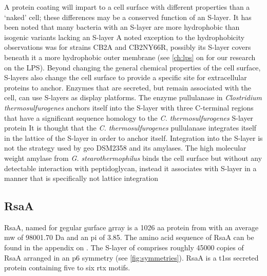 A protein coating will impart to a cell surface with different properties than a `naked' cell; these differences may be a conserved function of an \ac{S-layer}.
 It has been noted that many bacteria with an \ac{S-layer} are more hydrophobic than isogenic variants lacking an \ac{S-layer} A noted exception to the hydrophobicity observations was for \caulobacter strains CB2A and CB2NY66R, possibly its \ac{S-layer} covers beneath it a more hydrophobic outer membrane (see \cref{ch:lps} on  for our research on the \caulobacter \ac{LPS}). Beyond changing the general chemical properties of the cell surface, \acp{S-layer} also change the cell surface to provide a specific site for extracellular proteins to anchor. Enzymes that are secreted, but remain associated with the cell, can use \acp{S-layer} as display platforms. The enzyme pullulanase in \textit{Clostridium thermosulfurogenes} anchors itself into the \ac{S-layer} with three C-terminal regions that have a significant sequence homology to the \textit{C. thermosulfurogenes} \ac{S-layer} protein It is thought that the \textit{C. thermosulfurogenes} pullulanase integrates itself in the lattice of the \ac{S-layer} in order to anchor itself. Integration into the \ac{S-layer} is not the strategy used by \ac{geo} DSM2358 and its amylases. The high molecular weight amylase from \textit{G. stearothermophilus} binds the cell surface but without any detectable interaction with peptidoglycan, instead it associates with \ac{S-layer} in a manner that is specifically not lattice integration


\subsection{RsaA} \label{sec:intro-rsaa}

RsaA, named for \underline{r}egular \underline{s}urface \underline{a}rray is a 1026 \ac{aa} protein from \caulobacter with an average \ac{mw} of 98001.70 Da and an \ac{pi} of 3.85. The amino acid sequence of RsaA can be found in the appendix on . The \ac{S-layer} of \caulobacter comprises roughly 45000 copies of RsaA arranged in an p6 symmetry (see \cref{fig:symmetries}). RsaA is a \ac{t1ss} secreted protein containing five to six \ac{rtx} motifs.

